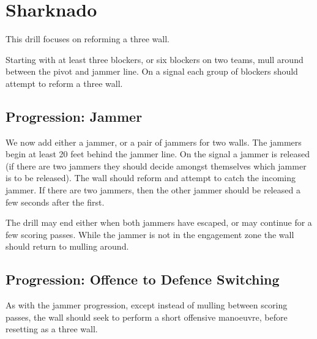 \section*{Sharknado}
\label{drill:three_wall:sharknado}

This drill focuses on reforming a three wall.

Starting with at least three blockers, or six blockers on two teams, mull around between the pivot and jammer line. 
On a signal each group of blockers should attempt to reform a three wall.


\subsection*{Progression: Jammer}
\label{drill:three_wall:sharknado:jammer}


We now add either a jammer, or a pair of jammers for two walls.
The jammers begin at least 20 feet behind the jammer line.
On the signal a jammer is released (if there are two jammers they should decide amongst themselves which jammer is to be released).
The wall should reform and attempt to catch the incoming jammer.
If there are two jammers, then the other jammer should be released a few seconds after the first.  

The drill may end either when both jammers have escaped, or may continue for a few scoring passes.
While the jammer is not in the engagement zone the wall should return to mulling around.


\subsection*{Progression: Offence to Defence Switching}
\label{drill:three_wall:sharknado:o_to_d}

As with the jammer progression, except instead of mulling between scoring passes, the wall should seek to perform a short offensive manoeuvre, before resetting as a three wall.    
